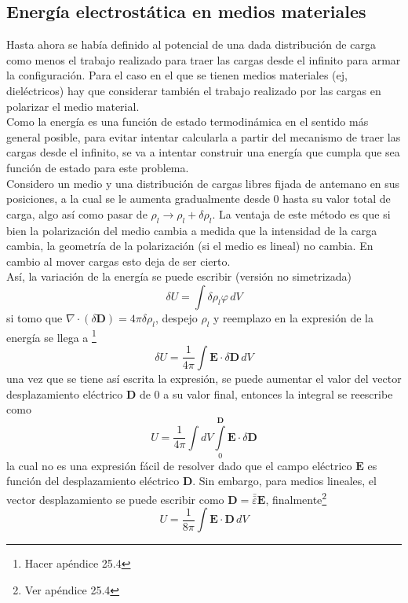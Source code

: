 \subsection{Energía electrostática en medios materiales}
Hasta ahora se había definido al potencial de una dada distribución de carga como menos el trabajo realizado para traer las cargas desde el infinito para armar la configuración. Para el caso en el que se tienen medios materiales (ej, dieléctricos) hay que considerar también el trabajo realizado por las cargas en polarizar el medio material.\\
\indent Como la energía es una función de estado termodinámica en el sentido más general posible, para evitar intentar calcularla a partir del mecanismo de traer las cargas desde el infinito, se va a intentar construir una energía que cumpla que sea función de estado para este problema.\\
\indent Considero un medio y una distribución de cargas libres fijada de antemano en sus posiciones, a la cual se le aumenta gradualmente desde $0$ hasta su valor total de carga, algo así como pasar de $\rho_{l} \longrightarrow \rho_{l}+\delta\rho_{l}$. La ventaja de este método es que si bien la polarización del medio cambia a medida que la intensidad de la carga cambia, la geometría de la polarización (si el medio es lineal) no cambia. En cambio al mover cargas esto deja de ser cierto.\\
\indent Así, la variación de la energía se puede escribir (versión no simetrizada)
\begin{equation*}
    \delta U = \int \delta \rho_{l} \varphi\,dV
\end{equation*}
si tomo que $\nabla\cdot (\delta \textbf{D}) = 4\pi \delta \rho_{l}$, despejo $\rho_{l}$ y reemplazo en la expresión de la energía se llega a \footnote{Hacer apéndice 25.4}
\begin{equation*}
    \delta U = \frac{1}{4\pi} 
    \int \textbf{E}\cdot \delta \textbf{D}\,dV
\end{equation*}
una vez que se tiene así escrita la expresión, se puede aumentar el valor del vector desplazamiento eléctrico $\textbf{D}$ de 0 a su valor final, entonces la integral se reescribe como
\begin{equation*}
    U = \frac{1}{4\pi}\int dV
    \int\limits_{0}^{\textbf{D}} 
    \textbf{E}\cdot \delta\textbf{D}
\end{equation*}
la cual no es una expresión fácil de resolver dado que el campo eléctrico $\textbf{E}$ es función del desplazamiento eléctrico $\textbf{D}$. Sin embargo, para medios lineales, el vector desplazamiento se puede escribir como $\textbf{D} = \bar{\bar{\varepsilon}}\textbf{E}$, finalmente\footnote{Ver apéndice 25.4}
\begin{equation*}
    U = \frac{1}{8\pi}\int \textbf{E}\cdot \textbf{D}\,dV
\end{equation*}


